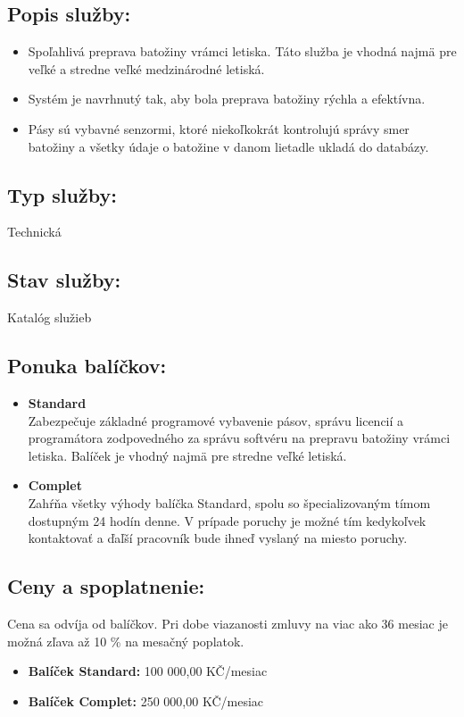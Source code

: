 \documentclass[a4paper, 11pt]{article}
\begin{document}
\subsection*{Popis služby:}
\begin{itemize}
\item Spoľahlivá preprava batožiny vrámci letiska. Táto služba je vhodná najmä pre veľké a stredne veľké medzinárodné letiská. 
\item Systém je navrhnutý tak, aby bola preprava batožiny rýchla a efektívna. 
\item Pásy sú vybavné senzormi, ktoré niekoľkokrát kontrolujú správy smer batožiny a všetky údaje o batožine v danom lietadle ukladá do databázy.
\end{itemize}
\subsection*{Typ služby:} Technická
\subsection*{Stav služby:} Katalóg služieb
\subsection*{Ponuka balíčkov:}
\begin{itemize}
\item \textbf{Standard} \\
Zabezpečuje základné programové vybavenie pásov, správu licencií a programátora zodpovedného za správu softvéru na prepravu batožiny vrámci letiska. Balíček je vhodný najmä pre stredne veľké letiská.
\item \textbf{Complet} \\
Zahŕňa všetky výhody balíčka Standard, spolu so špecializovaným tímom dostupným 24 hodín denne. V prípade poruchy je možné tím kedykoľvek kontaktovať a ďaľší pracovník bude ihneď vyslaný na miesto poruchy.
\end{itemize}
\subsection*{Ceny a spoplatnenie:}
Cena sa odvíja od balíčkov. Pri dobe viazanosti zmluvy na viac ako 36 mesiac je možná zľava až 10 \% na mesačný poplatok.
\begin{itemize}
\item \textbf{Balíček Standard:} 100 000,00 KČ/mesiac
\item \textbf{Balíček Complet:} 250 000,00 KČ/mesiac
\end{itemize}
\end{document}
